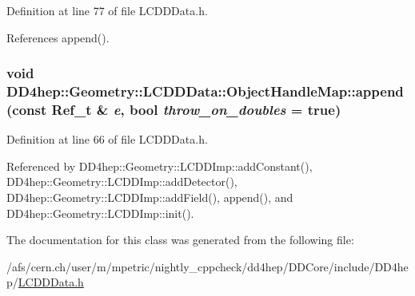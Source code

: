Definition at line 77 of file LCDDData.h.

References append().\hypertarget{class_d_d4hep_1_1_geometry_1_1_l_c_d_d_data_1_1_object_handle_map_a8881f90a02ef95a6a2e558f092e8f81a}{
\subsubsection[{append}]{\setlength{\rightskip}{0pt plus 5cm}void DD4hep::Geometry::LCDDData::ObjectHandleMap::append (const {\bf Ref\_\-t} \& {\em e}, \/  bool {\em throw\_\-on\_\-doubles} = {\ttfamily true})}}
\label{class_d_d4hep_1_1_geometry_1_1_l_c_d_d_data_1_1_object_handle_map_a8881f90a02ef95a6a2e558f092e8f81a}


Definition at line 66 of file LCDDData.h.

Referenced by DD4hep::Geometry::LCDDImp::addConstant(), DD4hep::Geometry::LCDDImp::addDetector(), DD4hep::Geometry::LCDDImp::addField(), append(), and DD4hep::Geometry::LCDDImp::init().

The documentation for this class was generated from the following file:\begin{DoxyCompactItemize}
\item 
/afs/cern.ch/user/m/mpetric/nightly\_\-cppcheck/dd4hep/DDCore/include/DD4hep/\hyperlink{_l_c_d_d_data_8h}{LCDDData.h}\end{DoxyCompactItemize}
